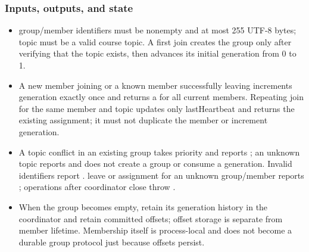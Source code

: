 \subsubsection*{Inputs, outputs, and state}
\begin{itemize}
\item group/member identifiers must be nonempty and at most 255 UTF-8 bytes; topic must be a valid course topic. A first join creates the group only after verifying that the topic exists, then advances its initial generation from 0 to 1.
\item A new member joining or a known member successfully leaving increments generation exactly once and returns a  for all current members. Repeating join for the same member and topic updates only lastHeartbeat and returns the existing assignment; it must not duplicate the member or increment generation.
\item A topic conflict in an existing group takes priority and reports ; an unknown topic reports  and does not create a group or consume a generation. Invalid identifiers report . leave or assignment for an unknown group/member reports ; operations after coordinator close throw .
\item When the group becomes empty, retain its generation history in the coordinator and retain committed offsets; offset storage is separate from member lifetime. Membership itself is process-local and does not become a durable group protocol just because offsets persist.
\end{itemize}
